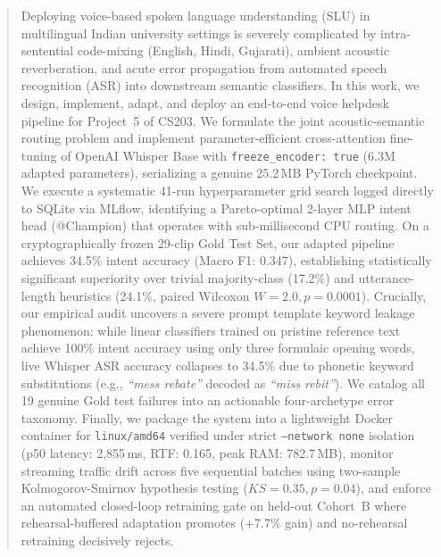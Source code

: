 \documentclass[sigconf,authordraft]{acmart}
\begin{document}
\begin{abstract}
Deploying voice-based spoken language understanding (SLU) in multilingual Indian university
settings is severely complicated by intra-sentential code-mixing (English, Hindi, Gujarati),
ambient acoustic reverberation, and acute error propagation from automated speech recognition
(ASR) into downstream semantic classifiers. In this work, we design, implement, adapt, and deploy
an end-to-end voice helpdesk pipeline for Project~5 of CS203. We formulate the joint acoustic-semantic
routing problem and implement parameter-efficient cross-attention fine-tuning of OpenAI Whisper Base
with \texttt{freeze\_encoder: true} (6.3M adapted parameters), serializing a genuine 25.2\,MB PyTorch
checkpoint. We execute a systematic 41-run hyperparameter grid search logged directly to SQLite via MLflow,
identifying a Pareto-optimal 2-layer MLP intent head (@Champion) that operates with sub-millisecond CPU routing.
On a cryptographically frozen 29-clip Gold Test Set, our adapted pipeline achieves 34.5\% intent accuracy
(Macro F1: 0.347), establishing statistically significant superiority over trivial majority-class (17.2\%)
and utterance-length heuristics (24.1\%, paired Wilcoxon $W = 2.0, p = 0.0001$). Crucially, our empirical audit
uncovers a severe prompt template keyword leakage phenomenon: while linear classifiers trained on pristine reference
text achieve 100\% intent accuracy using only three formulaic opening words, live Whisper ASR accuracy collapses
to 34.5\% due to phonetic keyword substitutions (e.g., \emph{``mess rebate''} decoded as \emph{``miss rebit''}).
We catalog all 19 genuine Gold test failures into an actionable four-archetype error taxonomy. Finally, we package
the system into a lightweight Docker container for \texttt{linux/amd64} verified under strict \texttt{--network none}
isolation (p50 latency: 2,855\,ms, RTF: 0.165, peak RAM: 782.7\,MB), monitor streaming traffic drift across five
sequential batches using two-sample Kolmogorov-Smirnov hypothesis testing ($KS = 0.35, p = 0.04$), and enforce an
automated closed-loop retraining gate on held-out Cohort~B where rehearsal-buffered adaptation promotes (+7.7\% gain)
and no-rehearsal retraining decisively rejects.
\end{abstract}
\end{document}
